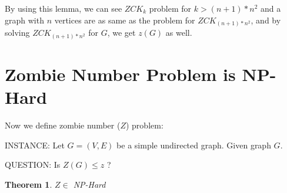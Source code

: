 \documentclass[1p]{elsarticle}
\newtheorem{theorem}{Theorem}
\begin{document}
	By using this lemma, we can see $ZCK_k$ problem for $k > (n + 1) * n^2$ and a graph with $n$ vertices are as same as
	the problem for $ZCK_{(n + 1) * n^2}$, and by solving $ZCK_{(n + 1) * n^2}$ for $G$, we get $z(G)$ as well.


	
	\section{Zombie Number Problem is NP-Hard}\label{np-zombienumber}

	Now we define zombie number ($Z$) problem:

	INSTANCE: Let $G = (V,E)$ be a simple undirected graph. Given graph $G$.

	QUESTION: Is $Z(G) \leq z$ ?

	\begin{theorem}
		$Z \in$ NP-Hard
	\end{theorem}
\end{document}
